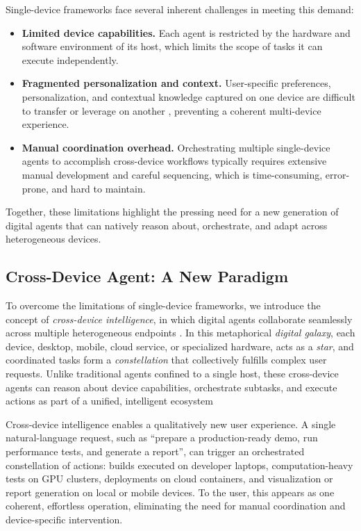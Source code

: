\documentclass[10pt]{article} %
\begin{document}
Single-device frameworks face several inherent challenges in meeting this demand:
\begin{itemize}
    \item \textbf{Limited device capabilities.} Each agent is restricted by the hardware and software environment of its host, which limits the scope of tasks it can execute independently.
    \item \textbf{Fragmented personalization and context.} User-specific preferences, personalization, and contextual knowledge captured on one device are difficult to transfer or leverage on another \cite{cemri2025multi}, preventing a coherent multi-device experience.
    \item \textbf{Manual coordination overhead.} Orchestrating multiple single-device agents to accomplish cross-device workflows typically requires extensive manual development and careful sequencing, which is time-consuming, error-prone, and hard to maintain.
\end{itemize}
Together, these limitations highlight the pressing need for a new generation of digital agents that can natively reason about, orchestrate, and adapt across heterogeneous devices.


\subsection{Cross-Device Agent: A New Paradigm}
\label{sec:background:crossdevice}

To overcome the limitations of single-device frameworks, we introduce the concept of \emph{cross-device intelligence}, in which digital agents collaborate seamlessly across multiple heterogeneous endpoints \cite{brudy2019cross}. In this metaphorical \emph{digital galaxy}, each device, desktop, mobile, cloud service, or specialized hardware, acts as a \emph{star}, and coordinated tasks form a \emph{constellation} that collectively fulfills complex user requests. Unlike traditional agents confined to a single host, these cross-device agents can reason about device capabilities, orchestrate subtasks, and execute actions as part of a unified, intelligent ecosystem \cite{cheninternet}

Cross-device intelligence enables a qualitatively new user experience. A single natural-language request, such as ``prepare a production-ready demo, run performance tests, and generate a report'', can trigger an orchestrated constellation of actions: builds executed on developer laptops, computation-heavy tests on GPU clusters, deployments on cloud containers, and visualization or report generation on local or mobile devices. To the user, this appears as one coherent, effortless operation, eliminating the need for manual coordination and device-specific intervention.
\end{document}

